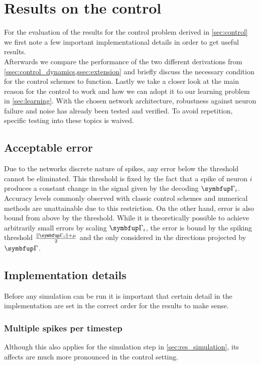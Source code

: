\section{Results on the control}\label{sec:res_control}
For the evaluation of the results for the control problem derived in \cref{sec:control} we first note a few important implementational details in order to get useful results. \\
Afterwards we compare the performance of the two different derivations from \cref{ssec:control_dynamics,ssec:extension} and briefly discuss the necessary condition for the control schemes to function.
Lastly we take a closer look at the main reason for the control to work and how we can adopt it to our learning problem in \cref{sec:learning}.
With the chosen network architecture, robustness against neuron failure and noise has already been tested and verified. To avoid repetition, specific testing into these topics is waived.
\subsection{Acceptable error}
Due to the networks discrete nature of spikes, any error below the threshold cannot be eliminated. This threshold is fixed by the fact that a spike of neuron $i$ produces a constant change in the signal given by the decoding $\bmu{\Gamma}_i$. Accuracy levels commonly observed with classic control schemes and numerical methods are unattainable due to this restriction. On the other hand, error is also bound from above by the threshold. While it is theoretically possible to achieve arbitrarily small errors by scaling $\bmu{\Gamma}_i$, the error is bound by the spiking threshold  $\frac{\|\bmu{\Gamma}_i\| + \mu}{2}$ and the only considered in the directions projected by $\bmu{\Gamma}$.


\subsection{Implementation details}
Before any simulation can be run it is important that certain detail in the implementation are set in the correct order for the results to make sense.

\subsubsection{Multiple spikes per timestep}
Although this also applies for the simulation step in \cref{sec:res_simulation}, its affects are much more pronounced in the control setting.\\
